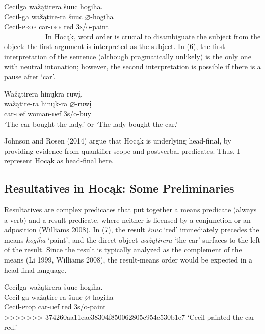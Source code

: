 \documentclass[output=paper]{LSP/langsci}
\begin{document}
\begin{exe}

\ex \glll Cecilga wažątirera šuuc hogiha. \\
Cecil-ga  wažątire-ra šuuc {$\varnothing$}-hogiha \\
Cecil-\textsc{prop} car-\textsc{def} red \textsc{3s/o}-paint\\
=======
In Hoc\k{a}k, word order is crucial to disambiguate the subject from the object: the first argument is interpreted as the subject. In (6), the first interpretation of the sentence (although pragmatically unlikely) is the only one with neutral intonation; however, the second interpretation is  possible if there is a pause after `car'.

\begin{exe}

\ex \glll Wa\v{z}\k{a}tirera hin\k{u}kra ruw\k{i}.\\
wa\v{z}\k{a}tire-ra hin\k{u}k-ra $\varnothing$-ruw\k{i}\\
car-{\textsc def} woman-{\textsc def} {\textsc 3s/o}-buy\\
\glt `The car bought the lady.' {\textsc or} `The lady bought the car.'

\end{exe}

Johnson and Rosen (2014) argue that Hoc\k{a}k is underlying head-final, by providing evidence from quantifier scope and postverbal predicates. Thus, I represent Hoc\k{a}k as head-final here.

\subsection{Resultatives in Hoc\k{a}k: Some Preliminaries}

Resultatives are complex predicates that put together a means predicate (always a verb) and a result predicate, where neither is licensed by a conjunction or an adposition (Williams 2008). In (7), the result \textit{\v{s}uuc} `red' immediately precedes the means \textit{hogiha} `paint', and the direct object \textit{wa\v{z}\k{a}tirera} `the car' surfaces to the left of the result. Since the result is typically analyzed as the complement of the means (Li 1999, Williams 2008), the result-means order would be expected in a head-final language.

\begin{exe}

\ex \glll Cecilga wa\v{z}\k{a}tirera \v{s}uuc hogiha. \\
Cecil-ga  wa\v{z}\k{a}tire-ra \v{s}uuc $\varnothing$-hogiha \\
Cecil-{\textsc prop} car-{\textsc def} red {\textsc 3s/o}-paint\\
>>>>>>> 374260aa11eac38304f850062805c954c530b1e7
\glt `Cecil painted the car red.'


\end{exe}
\end{exe}
\end{document}
